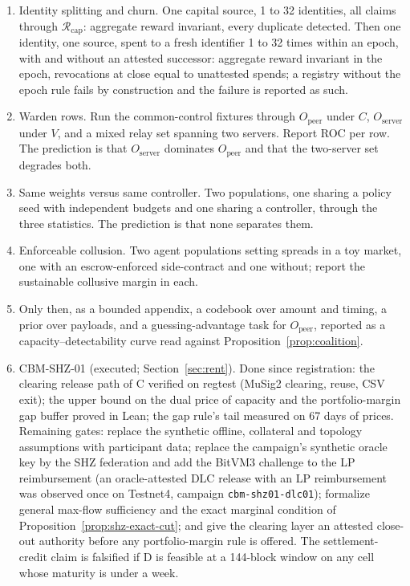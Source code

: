 \documentclass[11pt]{article}
\theoremstyle{plain}
\theoremstyle{definition}
\theoremstyle{remark}
\newcommand{\Rcap}{\mathcal{R}_{\mathrm{cap}}}
\begin{document}
\begin{enumerate}[leftmargin=*,itemsep=2pt]
\item Identity splitting and churn. One capital source, 1 to 32 identities, all claims through $\Rcap$: aggregate reward invariant, every duplicate detected. Then one identity, one source, spent to a fresh identifier 1 to 32 times within an epoch, with and without an attested successor: aggregate reward invariant in the epoch, revocations at close equal to unattested spends; a registry without the epoch rule fails by construction and the failure is reported as such.
\item Warden rows. Run the common-control fixtures through $O_{\mathrm{peer}}$ under $C$, $O_{\mathrm{server}}$ under $V$, and a mixed relay set spanning two servers. Report ROC per row. The prediction is that $O_{\mathrm{server}}$ dominates $O_{\mathrm{peer}}$ and that the two-server set degrades both.
\item Same weights versus same controller. Two populations, one sharing a policy seed with independent budgets and one sharing a controller, through the three statistics. The prediction is that none separates them.
\item Enforceable collusion. Two agent populations setting spreads in a toy market, one with an escrow-enforced side-contract and one without; report the sustainable collusive margin in each.
\item Only then, as a bounded appendix, a codebook over amount and timing, a prior over payloads, and a guessing-advantage task for $O_{\mathrm{peer}}$, reported as a capacity--detectability curve read against Proposition~\ref{prop:coalition}.
\item CBM-SHZ-01 (executed; Section~\ref{sec:rent}). Done since registration: the clearing release path of C verified on regtest (MuSig2 clearing, reuse, CSV exit); the upper bound on the dual price of capacity and the portfolio-margin gap buffer proved in Lean; the gap rule's tail measured on 67 days of prices. Remaining gates: replace the synthetic offline, collateral and topology assumptions with participant data; replace the campaign's synthetic oracle key by the SHZ federation and add the BitVM3 challenge to the LP reimbursement (an oracle-attested DLC release with an LP reimbursement was observed once on Testnet4, campaign \texttt{cbm-shz01-dlc01}); formalize general max-flow sufficiency and the exact marginal condition of Proposition~\ref{prop:shz-exact-cut}; and give the clearing layer an attested close-out authority before any portfolio-margin rule is offered. The settlement-credit claim is falsified if D is feasible at a 144-block window on any cell whose maturity is under a week.

\end{enumerate}
\end{document}
